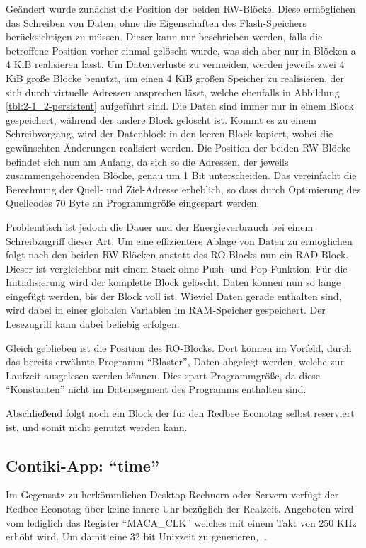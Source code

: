 Geändert wurde zunächst die Position der beiden RW-Blöcke. Diese ermöglichen das Schreiben von Daten, ohne die Eigenschaften des Flash-Speichers berücksichtigen
zu müssen. Dieser kann nur beschrieben werden, falls die betroffene Position vorher einmal gelöscht wurde, was sich aber nur in Blöcken a 4 KiB realisieren lässt.
Um Datenverluste zu vermeiden, werden jeweils zwei 4 KiB große Blöcke benutzt, um einen 4 KiB großen Speicher zu realisieren, der sich durch virtuelle Adressen
ansprechen lässt, welche ebenfalls in Abbildung \ref{tbl:2-1_2-persistent} aufgeführt sind. Die Daten sind immer nur in einem Block gespeichert, während der andere
Block gelöscht ist. Kommt es zu einem Schreibvorgang, wird der Datenblock in den leeren Block kopiert, wobei die gewünschten Änderungen realisiert werden.
Die Position der beiden RW-Blöcke befindet sich nun am Anfang, da sich so die Adressen, der jeweils zusammengehörenden Blöcke, genau um 1 Bit unterscheiden.
Das vereinfacht die Berechnung der Quell- und Ziel-Adresse erheblich, so dass durch Optimierung des Quellcodes 70 Byte an Programmgröße eingespart werden.

Problemtisch ist jedoch die Dauer und der Energieverbrauch bei einem Schreibzugriff dieser Art. Um eine effizientere Ablage von Daten zu ermöglichen folgt
nach den beiden RW-Blöcken anstatt des RO-Blocks nun ein RAD-Block. Dieser ist vergleichbar mit einem Stack ohne Push- und Pop-Funktion. Für die Initialisierung
wird der komplette Block gelöscht. Daten können nun so lange eingefügt werden, bis der Block voll ist. Wieviel Daten gerade enthalten sind, wird dabei in einer
globalen Variablen im RAM-Speicher gespeichert. Der Lesezugriff kann dabei beliebig erfolgen.

Gleich geblieben ist die Position des RO-Blocks. Dort können im Vorfeld, durch das bereits erwähnte Programm "`Blaster"', Daten abgelegt werden, welche zur Laufzeit
ausgelesen werden können. Dies spart Programmgröße, da diese "`Konstanten"' nicht im Datensegment des Programms enthalten sind.

Abschließend folgt noch ein Block der für den Redbee Econotag selbst reserviert ist, und somit nicht genutzt werden kann.

\subsection{Contiki-App: "`time"'}

Im Gegensatz zu herkömmlichen Desktop-Rechnern oder Servern verfügt der Redbee Econotag über keine innere Uhr bezüglich der Realzeit.
Angeboten wird vom  lediglich das Register "`MACA\_CLK"' welches mit einem Takt von 250 KHz erhöht wird. Um damit eine
32 bit Unixzeit zu generieren, .. 

